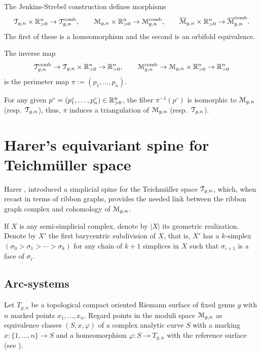 \begin{theorem} 
  The Jenkins-Strebel construction defines morphisms
  \begin{equation*}
    \mathcal{T}_{g,n} \times \mathbb{R}_{>0}^n \to \mathcal{T}\sp{\text{comb}}_{g,n}, 
    \qquad
    \mathcal{M}_{g,n} \times \mathbb{R}_{>0}^n \to \mathcal{M}\sp{\text{comb}}_{g,n}, 
    \qquad 
    \overline{\mathcal{M}}_{g,n} \times \mathbb{R}_{>0}^n \to \overline{\mathcal{M}}\sp{\text{comb}}_{g,n}.
  \end{equation*}
  The first of these is a homeomorphism and the second is an orbifold
  equivalence. 

  The inverse map
  \begin{equation*}
    \mathcal{T}\sp{\text{comb}}_{g,n} \to \mathcal{T}_{g,n} \times \mathbb{R}_{>0}^n \to \mathbb{R}_{>0}^n,
    \qquad
    \mathcal{M}\sp{\text{comb}}_{g,n} \to \mathcal{M}_{g,n} \times \mathbb{R}_{>0}^n \to \mathbb{R}_{>0}^n
  \end{equation*}
  is the perimeter map $\pi := (p_1, \ldots, p_n)$.  
\end{theorem}

For any given $p^\circ = (p_1^\circ, \ldots, p_n^\circ) \in \mathbb{R}_{>0}^n$, the fiber
$\pi^{-1}(p^\circ)$ is isomorphic to $\mathcal{M}_{g,n}$ (resp.\ $\mathcal{T}_{g,n}$), thus,
$\pi$ induces a triangulation of $\mathcal{M}_{g,n}$ (resp.\ $\mathcal{T}_{g,n}$).



\section{Harer's equivariant spine for Teichm\"uller space}
\label{sec:spine}

Harer \cite{harer;cohomological-dimension}, introduced a simplicial
spine for the Teichm\"uller space $\mathcal{T}_{g,n}$, which, when recast in
terms of ribbon graphs, provides the needed link between the ribbon
graph complex and cohomology of $\mathcal{M}_{g,n}$.

If $X$ is any semi-simplicial complex, denote by $|X|$ its geometric
realization.  Denote by $X'$ the first barycentric subdivision of $X$,
that is, $X'$ has a $k$-simplex $(\sigma_0 > \sigma_1 > \cdots > \sigma_k)$ for any chain
of $k+1$ simplices in $X$ such that $\sigma_{i+1}$ is a face of $\sigma_i$.


\subsection{Arc-systems}
\label{sec:arc-systems}

Let $T_{g,n}$ be a topological compact oriented Riemann surface of
fixed genus $g$ with $n$ marked points $x_1, \ldots, x_n$.  Regard points
in the moduli space $\mathcal{M}_{g,n}$ as equivalence classes $(S,x,\varphi)$ of a
complex analytic curve $S$ with a marking $x:\{1,\ldots,n\}\to S$ and a
homeomorphism $\varphi:S\to T_{g,n}$ with the reference surface (see
).

